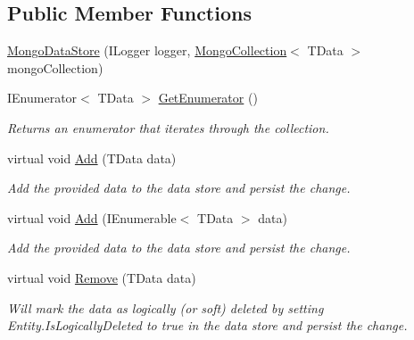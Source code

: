 \subsection*{Public Member Functions}
\begin{DoxyCompactItemize}
\item 
\hyperlink{classCqrs_1_1Mongo_1_1DataStores_1_1MongoDataStore_a39f738d53074a548e6932bacdc4a4e3a_a39f738d53074a548e6932bacdc4a4e3a}{Mongo\+Data\+Store} (I\+Logger logger, \hyperlink{classCqrs_1_1Mongo_1_1DataStores_1_1MongoDataStore_aa183a8ce44ec16d755f1e4fbe5ec4b10_aa183a8ce44ec16d755f1e4fbe5ec4b10}{Mongo\+Collection}$<$ T\+Data $>$ mongo\+Collection)
\item 
I\+Enumerator$<$ T\+Data $>$ \hyperlink{classCqrs_1_1Mongo_1_1DataStores_1_1MongoDataStore_a3eeaf3e59a540025ff2aa0f62b5dd465_a3eeaf3e59a540025ff2aa0f62b5dd465}{Get\+Enumerator} ()
\begin{DoxyCompactList}\small\item\em Returns an enumerator that iterates through the collection. \end{DoxyCompactList}\item 
virtual void \hyperlink{classCqrs_1_1Mongo_1_1DataStores_1_1MongoDataStore_a27bcfb40fe8203e09d320b2aa19fff3a_a27bcfb40fe8203e09d320b2aa19fff3a}{Add} (T\+Data data)
\begin{DoxyCompactList}\small\item\em Add the provided {\itshape data}  to the data store and persist the change. \end{DoxyCompactList}\item 
virtual void \hyperlink{classCqrs_1_1Mongo_1_1DataStores_1_1MongoDataStore_a38c242b255dc17cf8d19470fdf5a99bf_a38c242b255dc17cf8d19470fdf5a99bf}{Add} (I\+Enumerable$<$ T\+Data $>$ data)
\begin{DoxyCompactList}\small\item\em Add the provided {\itshape data}  to the data store and persist the change. \end{DoxyCompactList}\item 
virtual void \hyperlink{classCqrs_1_1Mongo_1_1DataStores_1_1MongoDataStore_a64003d01de3ac6ffd0e41bb7f572bf96_a64003d01de3ac6ffd0e41bb7f572bf96}{Remove} (T\+Data data)
\begin{DoxyCompactList}\small\item\em Will mark the {\itshape data}  as logically (or soft) deleted by setting Entity.\+Is\+Logically\+Deleted to true in the data store and persist the change. \end{DoxyCompactList}\item 

\end{DoxyCompactItemize}
